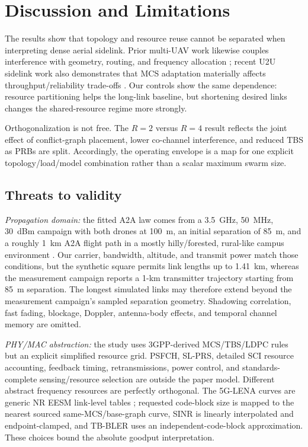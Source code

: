 \section{Discussion and Limitations}
The results show that topology and resource reuse cannot be separated when interpreting dense aerial sidelink. Prior multi-UAV work likewise couples interference with geometry, routing, and frequency allocation \cite{lau2023outage,alam2024jtfr}; recent U2U sidelink work also demonstrates that MCS adaptation materially affects throughput/reliability trade-offs \cite{yu2025uavlink}. Our controls show the same dependence: resource partitioning helps the long-link baseline, but shortening desired links changes the shared-resource regime more strongly.

Orthogonalization is not free. The $R=2$ versus $R=4$ result reflects the joint effect of conflict-graph placement, lower co-channel interference, and reduced TBS as PRBs are split. Accordingly, the operating envelope is a map for one explicit topology/load/model combination rather than a scalar maximum swarm size.

\subsection{Threats to validity}
\emph{Propagation domain:} the fitted A2A law comes from a 3.5~GHz, 50~MHz, 30~dBm campaign with both drones at 100~m, an initial separation of 85~m, and a roughly 1~km A2A flight path in a mostly hilly/forested, rural-like campus environment \cite{erdemir2023a2a}. Our carrier, bandwidth, altitude, and transmit power match those conditions, but the synthetic square permits link lengths up to 1.41~km, whereas the measurement campaign reports a 1-km transmitter trajectory starting from 85~m separation. The longest simulated links may therefore extend beyond the measurement campaign's sampled separation geometry. Shadowing correlation, fast fading, blockage, Doppler, antenna-body effects, and temporal channel memory are omitted.

\emph{PHY/MAC abstraction:} the study uses 3GPP-derived MCS/TBS/LDPC rules but an explicit simplified resource grid. PSFCH, SL-PRS, detailed SCI resource accounting, feedback timing, retransmissions, power control, and standards-complete sensing/resource selection are outside the paper model. Different abstract frequency resources are perfectly orthogonal. The 5G-LENA curves are generic NR EESM link-level tables \cite{patriciello2019e2e,ferreira2026lena}; requested code-block size is mapped to the nearest sourced same-MCS/base-graph curve, SINR is linearly interpolated and endpoint-clamped, and TB-BLER uses an independent-code-block approximation. These choices bound the absolute goodput interpretation.

